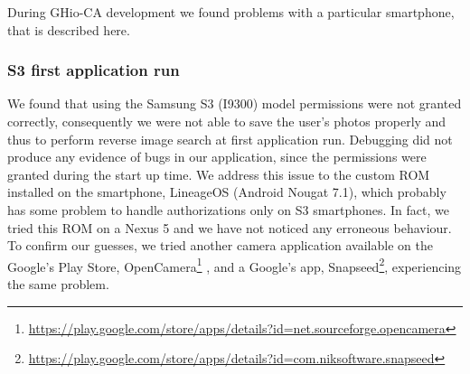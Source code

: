 During GHio-CA development we found problems with a particular smartphone, 
that is described here.

\subsubsection{S3 first application run}

We found that using the Samsung S3 (I9300) model permissions were not granted correctly, consequently we were not able to save the user's photos properly and thus to perform reverse image search at first application run. Debugging did not produce any evidence of bugs in our application, since the permissions 
were granted during the start up time.
We address this issue to the custom ROM installed on the smartphone, LineageOS 
(Android Nougat 7.1), which probably has some problem to handle authorizations only on S3 smartphones. In fact, we tried this ROM on a Nexus 5 and we have not noticed any erroneous behaviour. To confirm our guesses, we tried another camera application available on the Google's Play Store, OpenCamera\footnote{\url{https://play.google.com/store/apps/details?id=net.sourceforge.opencamera}}
, and a Google's app, Snapseed\footnote{\url{https://play.google.com/store/apps/details?id=com.niksoftware.snapseed}}, experiencing the same problem.